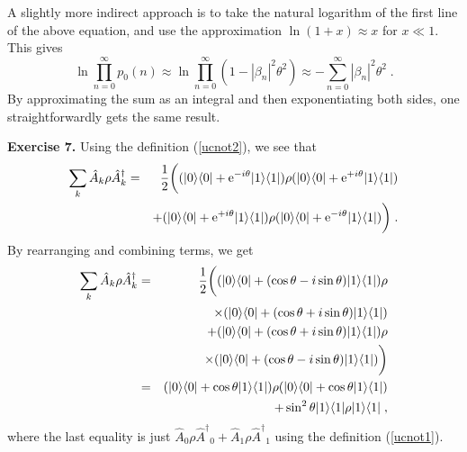 \documentclass[12pt]{article}
\def\bra#1{{\langle #1 |}}
\def\ket#1{{| #1 \rangle}}
\def\e{{\rm e}}
\def\A{{\hat A}}
\def\Adag{{\hat A^\dagger}}
\begin{document}
A slightly more indirect approach is to take the natural logarithm
of the first line of the above equation, and use the approximation
$\ln(1+x) \approx x$ for $x \ll 1$.  This gives
\[
\ln \prod_{n=0}^\infty p_0(n)
  \approx \ln \prod_{n=0}^\infty (1-|\beta_n|^2\theta^2)
  \approx - \sum_{n=0}^\infty |\beta_n|^2\theta^2 \;.
\]
By approximating the sum as an integral and then exponentiating both
sides, one straightforwardly gets the same result.

{\bf Exercise 7.}  Using the definition (\ref{ucnot2}), we see that
\begin{eqnarray}
\sum_k \A_k \rho \Adag_k &=&
  {1\over2}\biggl( (\ket0\bra0 + \e^{-i\theta}\ket1\bra1 )
  \rho (\ket0\bra0 + \e^{+i\theta}\ket1\bra1 ) \nonumber\\
&& + (\ket0\bra0 + \e^{+i\theta}\ket1\bra1 )\rho
  (\ket0\bra0 + \e^{-i\theta}\ket1\bra1) \biggr) \;. \nonumber
\end{eqnarray}
By rearranging and combining terms, we get
\begin{eqnarray}
\sum_k \A_k \rho \Adag_k &=&
  {1\over2}\biggl( (\ket0\bra0 + (\cos\theta-i\sin\theta)\ket1\bra1 )
  \rho \nonumber\\
&& \times (\ket0\bra0 + (\cos\theta+i\sin\theta)\ket1\bra1 ) \nonumber\\
&& + (\ket0\bra0 + (\cos\theta+i\sin\theta)\ket1\bra1 )\rho \nonumber\\
&& \times (\ket0\bra0 + (\cos\theta-i\sin\theta)\ket1\bra1) \biggr) \nonumber\\
&=&   (\ket0\bra0 + \cos\theta\ket1\bra1)
  \rho (\ket0\bra0 + \cos\theta\ket1\bra1) \nonumber\\
&& + \sin^2\theta \ket1\bra1 \rho \ket1\bra1 \;, \nonumber
\end{eqnarray}
where the last equality is just $\A_0\rho\Adag_0 + \A_1\rho\Adag_1$ using
the definition (\ref{ucnot1}).
\end{document}
